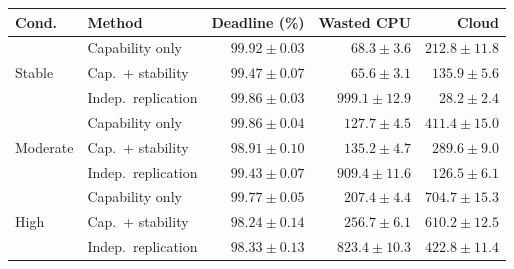 \begin{tabular}{@{}llrrr@{}}
\toprule
Cond. & Method & Deadline (\%) & Wasted CPU & Cloud \\
\midrule
 \multirow{3}{*}{Stable} & Capability only & $99.92 \pm 0.03$ & $68.3 \pm 3.6$ & $212.8 \pm 11.8$ \\
  & Cap.\ + stability & $99.47 \pm 0.07$ & $65.6 \pm 3.1$ & $135.9 \pm 5.6$ \\
  & Indep.\ replication & $99.86 \pm 0.03$ & $999.1 \pm 12.9$ & $28.2 \pm 2.4$ \\
\midrule
 \multirow{3}{*}{Moderate} & Capability only & $99.86 \pm 0.04$ & $127.7 \pm 4.5$ & $411.4 \pm 15.0$ \\
  & Cap.\ + stability & $98.91 \pm 0.10$ & $135.2 \pm 4.7$ & $289.6 \pm 9.0$ \\
  & Indep.\ replication & $99.43 \pm 0.07$ & $909.4 \pm 11.6$ & $126.5 \pm 6.1$ \\
\midrule
 \multirow{3}{*}{High} & Capability only & $99.77 \pm 0.05$ & $207.4 \pm 4.4$ & $704.7 \pm 15.3$ \\
  & Cap.\ + stability & $98.24 \pm 0.14$ & $256.7 \pm 6.1$ & $610.2 \pm 12.5$ \\
  & Indep.\ replication & $98.33 \pm 0.13$ & $823.4 \pm 10.3$ & $422.8 \pm 11.4$ \\
\bottomrule
\end{tabular}
